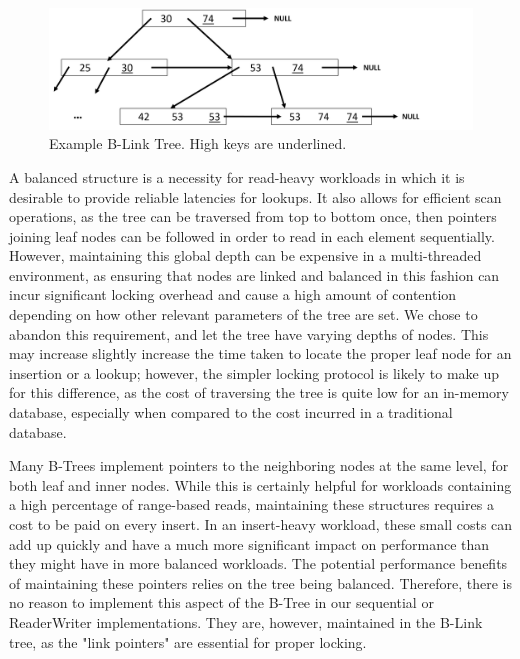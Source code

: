 \documentclass{sig-alternate}
\begin{document}
\begin{figure}
	\includegraphics[width=\linewidth]{LinkTree}
	\caption[font={12}]{Example B-Link Tree. High keys are underlined.}
\end{figure}

A balanced structure is a necessity for read-heavy workloads in which it is desirable to provide reliable latencies for lookups. It also allows for efficient scan operations, as the tree can be traversed from top to bottom once, then pointers joining leaf nodes can be followed in order to read in each element sequentially. However, maintaining this global depth can be expensive in a multi-threaded environment, as ensuring that nodes are linked and balanced in this fashion can incur significant locking overhead and cause a high amount of contention depending on how other relevant parameters of the tree are set.  We chose to abandon this requirement, and let the tree have varying depths of nodes.  This may increase slightly increase the time taken to locate the proper leaf node for an insertion or a lookup; however, the simpler locking protocol is likely to make up for this difference, as the cost of traversing the tree is quite low for an in-memory database, especially when compared to the cost incurred in a traditional database. 

Many B-Trees implement pointers to the neighboring nodes at the same level, for both leaf and inner nodes.  While this is certainly helpful for workloads containing a high percentage of range-based reads, maintaining these structures requires a cost to be paid on every insert.  In an insert-heavy workload, these small costs can add up quickly and have a much more significant impact on performance than they might have in more balanced workloads.  The potential performance benefits of maintaining these pointers relies on the tree being balanced.  Therefore, there is no reason to implement this aspect of the B-Tree in our sequential or ReaderWriter implementations. They are, however, maintained in the B-Link tree, as the "link pointers" are essential for proper locking.
\end{document}
